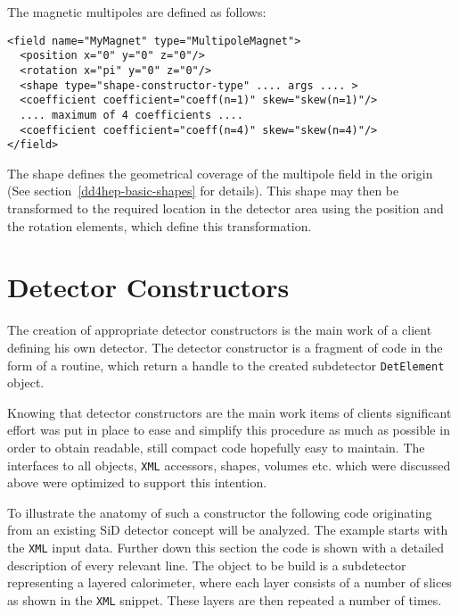 The magnetic multipoles are defined as follows:
\begin{verbatim}
<field name="MyMagnet" type="MultipoleMagnet">
  <position x="0" y="0" z="0"/>
  <rotation x="pi" y="0" z="0"/>
  <shape type="shape-constructor-type" .... args .... >
  <coefficient coefficient="coeff(n=1)" skew="skew(n=1)"/>
  .... maximum of 4 coefficients ....
  <coefficient coefficient="coeff(n=4)" skew="skew(n=4)"/>
</field>
\end{verbatim}
The shape defines the geometrical coverage of the multipole  field in the origin (See section~\ref{dd4hep-basic-shapes} for details).  This shape may then be transformed to the required location in the detector area using the position  and the rotation elements, which define this transformation.


\section{Detector Constructors}
\label{sec:dd4hep-manual-detector-constructors}

The creation of appropriate detector constructors is the main work of a client defining his own detector. The detector constructor is a fragment of code in the  form of a routine, which return a handle to the created subdetector \texttt{DetElement} object.

Knowing that detector constructors are the main work items of clients significant  effort was put in place to ease and simplify this procedure as much as possible in order to obtain readable, still compact code hopefully easy to maintain. The interfaces to all objects, \texttt{XML} accessors, shapes, volumes etc. which were  discussed above were optimized to support this intention.

To illustrate the anatomy of such a constructor the following code originating from an existing SiD detector concept will be analyzed. The example starts with the \texttt{XML} input data. Further down this section the code is shown with a detailed description of every relevant line. The object to be build is a subdetector representing a layered calorimeter,  where each layer consists of a number of slices as shown in the \texttt{XML} snippet. These layers are then repeated a number of times.

